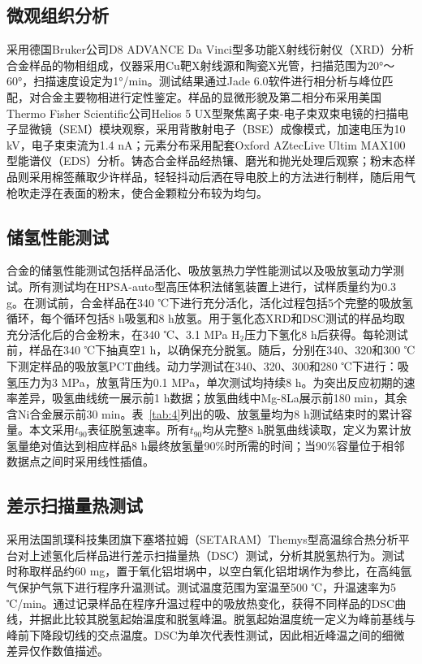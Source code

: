 \documentclass[UTF8,10pt]{ctexart}
\begin{document}
\subsection{微观组织分析}
采用德国Bruker公司D8 ADVANCE Da Vinci型多功能X射线衍射仪（XRD）分析合金样品的物相组成，仪器采用Cu靶X射线源和陶瓷X光管，扫描范围为20°～60°，扫描速度设定为1°/min。测试结果通过Jade 6.0软件进行相分析与峰位匹配，对合金主要物相进行定性鉴定。样品的显微形貌及第二相分布采用美国Thermo Fisher Scientific公司Helios 5 UX型聚焦离子束-电子束双束电镜的扫描电子显微镜（SEM）模块观察，采用背散射电子（BSE）成像模式，加速电压为10 kV，电子束束流为1.4 nA；元素分布采用配套Oxford AZtecLive Ultim MAX100型能谱仪（EDS）分析。铸态合金样品经热镶、磨光和抛光处理后观察；粉末态样品则采用棉签蘸取少许样品，轻轻抖动后洒在导电胶上的方法进行制样，随后用气枪吹走浮在表面的粉末，使合金颗粒分布较为均匀。

\subsection{储氢性能测试}
合金的储氢性能测试包括样品活化、吸放氢热力学性能测试以及吸放氢动力学测试。所有测试均在HPSA-auto型高压体积法储氢装置上进行，试样质量约为0.3 g。在测试前，合金样品在340 ℃下进行充分活化，活化过程包括5个完整的吸放氢循环，每个循环包括8 h吸氢和8 h放氢。用于氢化态XRD和DSC测试的样品均取充分活化后的合金粉末，在340 ℃、3.1 MPa H$_2$压力下氢化8 h后获得。每轮测试前，样品在340 ℃下抽真空1 h，以确保充分脱氢。随后，分别在340、320和300 ℃下测定样品的吸放氢PCT曲线。动力学测试在340、320、300和280 ℃下进行：吸氢压力为3 MPa，放氢背压为0.1 MPa，单次测试均持续8 h。为突出反应初期的速率差异，吸氢曲线统一展示前1 h数据；放氢曲线中Mg-8La展示前180 min，其余含Ni合金展示前30 min。表~\ref{tab:4}列出的吸、放氢量均为8 h测试结束时的累计容量。本文采用$t_{90}$表征脱氢速率。所有$t_{90}$均从完整8 h脱氢曲线读取，定义为累计放氢量绝对值达到相应样品8 h最终放氢量90\%时所需的时间；当90\%容量位于相邻数据点之间时采用线性插值。

\subsection{差示扫描量热测试}
采用法国凯璞科技集团旗下塞塔拉姆（SETARAM）Themys型高温综合热分析平台对上述氢化后样品进行差示扫描量热（DSC）测试，分析其脱氢热行为。测试时称取样品约60 mg，置于氧化铝坩埚中，以空白氧化铝坩埚作为参比，在高纯氩气保护气氛下进行程序升温测试。测试温度范围为室温至500 ℃，升温速率为5 ℃/min。通过记录样品在程序升温过程中的吸放热变化，获得不同样品的DSC曲线，并据此比较其脱氢起始温度和脱氢峰温。脱氢起始温度统一定义为峰前基线与峰前下降段切线的交点温度。DSC为单次代表性测试，因此相近峰温之间的细微差异仅作数值描述。
\end{document}
